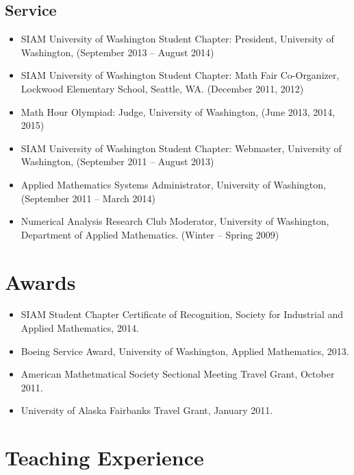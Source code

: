 \documentclass{article}
\begin{document}
\subsection*{Service}
\begin{itemize}
  \item {SIAM University of Washington Student Chapter: President},
    University of Washington, (September 2013 -- August 2014)
  \item {SIAM University of Washington Student Chapter: Math Fair
    Co-Organizer}, Lockwood Elementary School, Seattle, WA. (December
    2011, 2012)
  \item {Math Hour Olympiad: Judge}, University of Washington, (June
    2013, 2014, 2015)
  \item {SIAM University of Washington Student Chapter: Webmaster},
    University of Washington, (September 2011 -- August 2013)
  \item {Applied Mathematics Systems Administrator}, University of
    Washington, (September 2011 -- March 2014)
  \item {Numerical Analysis Research Club Moderator}, University of
    Washington, Department of Applied Mathematics. (Winter -- Spring
    2009)
\end{itemize}



\section*{Awards}

\begin{itemize}
  \item SIAM Student Chapter Certificate of Recognition, Society for
    Industrial and Applied Mathematics, 2014.
  \item Boeing Service Award, University of Washington, Applied
    Mathematics, 2013.
  \item American Mathetmatical Society Sectional Meeting Travel Grant,
    October 2011.
  \item University of Alaska Fairbanks Travel Grant, January 2011.
\end{itemize}


\section*{Teaching Experience}
\end{document}
